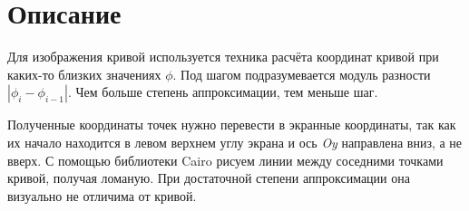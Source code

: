 \section{Описание}
Для изображения кривой используется техника расчёта координат кривой при каких-то близких значениях $\phi$. Под шагом подразумевается модуль разности $|{\phi}_i - {\phi}_{i - 1}|$. Чем больше степень аппроксимации, тем меньше шаг.

Полученные координаты точек нужно перевести в экранные координаты, так как их начало находится в левом верхнем углу экрана и ось \textit{Oy} направлена вниз, а не вверх. С помощью библиотеки Cairo рисуем линии между соседними точками кривой, получая ломаную. При достаточной степени аппроксимации она визуально не отличима от кривой.
\pagebreak
